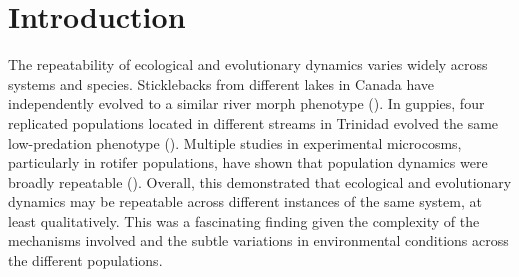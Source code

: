 \documentclass[11pt, oneside]{article}
\begin{document}
\newpage
{}
\setcounter{page}{1}
\linenumbers

\section{Introduction}

The repeatability of ecological and evolutionary dynamics varies widely across systems and species.
Sticklebacks from different lakes in Canada have independently evolved to a similar river morph phenotype (\cite{Thompson1997}).
In guppies, four replicated populations located in different streams in Trinidad evolved the same low-predation phenotype (\cite{Reznick1990a}). 
Multiple studies in experimental microcosms, particularly in rotifer populations, have shown that population dynamics were broadly repeatable (\cite{Yoshida2003, Yoshida2007, Becks2010, Becks2012, Hiltunen2013}).
Overall, this demonstrated that ecological and evolutionary dynamics may be repeatable across different instances of the same system, at least qualitatively.
This was a fascinating finding given the complexity of the mechanisms involved and the subtle variations in environmental conditions across the different populations.
\end{document}
